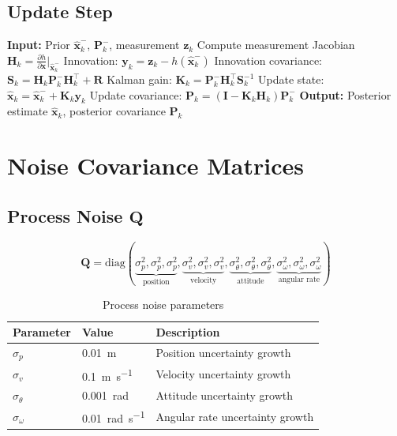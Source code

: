 \subsection{Update Step}

\begin{algorithm}[H]
\caption{EKF Update Step}
\begin{algorithmic}[1]
    \State \textbf{Input:} Prior $\hat{\mathbf{x}}_k^-$, $\mathbf{P}_k^-$, measurement $\mathbf{z}_k$
    \State Compute measurement Jacobian $\mathbf{H}_k = \frac{\partial h}{\partial \mathbf{x}}\bigg|_{\hat{\mathbf{x}}_k^-}$
    \State Innovation: $\mathbf{y}_k = \mathbf{z}_k - h(\hat{\mathbf{x}}_k^-)$
    \State Innovation covariance: $\mathbf{S}_k = \mathbf{H}_k \mathbf{P}_k^- \mathbf{H}_k^\top + \mathbf{R}$
    \State Kalman gain: $\mathbf{K}_k = \mathbf{P}_k^- \mathbf{H}_k^\top \mathbf{S}_k^{-1}$
    \State Update state: $\hat{\mathbf{x}}_k = \hat{\mathbf{x}}_k^- + \mathbf{K}_k \mathbf{y}_k$
    \State Update covariance: $\mathbf{P}_k = (\mathbf{I} - \mathbf{K}_k \mathbf{H}_k) \mathbf{P}_k^-$
    \State \textbf{Output:} Posterior estimate $\hat{\mathbf{x}}_k$, posterior covariance $\mathbf{P}_k$
\end{algorithmic}
\end{algorithm}

\section{Noise Covariance Matrices}

\subsection{Process Noise $\mathbf{Q}$}

\begin{equation}
    \mathbf{Q} = \text{diag}\left(
        \underbrace{\sigma_p^2, \sigma_p^2, \sigma_p^2}_{\text{position}},
        \underbrace{\sigma_v^2, \sigma_v^2, \sigma_v^2}_{\text{velocity}},
        \underbrace{\sigma_\theta^2, \sigma_\theta^2, \sigma_\theta^2}_{\text{attitude}},
        \underbrace{\sigma_\omega^2, \sigma_\omega^2, \sigma_\omega^2}_{\text{angular rate}}
    \right)
\end{equation}

\begin{table}[htbp]
    \centering
    \caption{Process noise parameters}
    \label{tab:process_noise}
    \begin{tabular}{@{}lll@{}}
        \toprule
        \textbf{Parameter} & \textbf{Value} & \textbf{Description} \\
        \midrule
        $\sigma_p$ & \SI{0.01}{\meter} & Position uncertainty growth \\
        $\sigma_v$ & \SI{0.1}{\meter\per\second} & Velocity uncertainty growth \\
        $\sigma_\theta$ & \SI{0.001}{\radian} & Attitude uncertainty growth \\
        $\sigma_\omega$ & \SI{0.01}{\radian\per\second} & Angular rate uncertainty growth \\
        \bottomrule
    \end{tabular}
\end{table}

